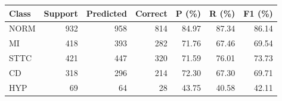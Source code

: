 \begin{tabular}{lrrrrrr}
\toprule
Class & Support & Predicted & Correct & P (\%) & R (\%) & F1 (\%) \\
\midrule
NORM & 932 & 958 & 814 & 84.97 & 87.34 & 86.14 \\
MI & 418 & 393 & 282 & 71.76 & 67.46 & 69.54 \\
STTC & 421 & 447 & 320 & 71.59 & 76.01 & 73.73 \\
CD & 318 & 296 & 214 & 72.30 & 67.30 & 69.71 \\
HYP & 69 & 64 & 28 & 43.75 & 40.58 & 42.11 \\
\bottomrule
\end{tabular}
